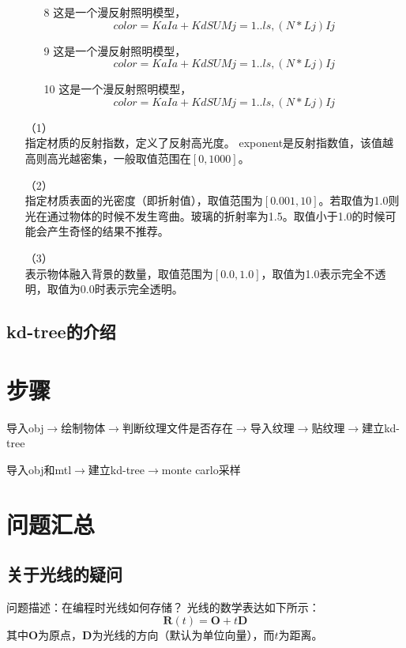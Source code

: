\documentclass[10pt]{article}
\begin{document}
\begin{itemize}
\begin{itemize}
\item[8]{这是一个漫反射照明模型，}
$$color=KaIa+ Kd { SUM j=1..ls, (N * Lj)Ij }$$

\item[9]{这是一个漫反射照明模型，}
$$color=KaIa+ Kd { SUM j=1..ls, (N * Lj)Ij }$$

\item[10]{ 这是一个漫反射照明模型，}
$$color=KaIa+ Kd { SUM j=1..ls, (N * Lj)Ij }$$
\end{itemize}


\item[（1）]{}\\
指定材质的反射指数，定义了反射高光度。 exponent是反射指数值，该值越高则高光越密集，一般取值范围在$[0,1000]$。 

\item[（2）]{} \\
指定材质表面的光密度（即折射值），取值范围为$[0.001,10]$。若取值为1.0则光在通过物体的时候不发生弯曲。玻璃的折射率为1.5。取值小于1.0的时候可能会产生奇怪的结果不推荐。

\item[（3）]{}\\
表示物体融入背景的数量，取值范围为$[0.0,1.0]$，取值为1.0表示完全不透明，取值为0.0时表示完全透明。

\end{itemize}


\subsection{kd-tree的介绍}


\section{步骤}
导入obj$\to$绘制物体$\to$判断纹理文件是否存在$\to$导入纹理$\to$贴纹理$\to$建立kd-tree

导入obj和mtl$\to$建立kd-tree$\to$monte carlo采样

\section{问题汇总}
\subsection{关于光线的疑问}
问题描述：在编程时光线如何存储？
光线的数学表达如下所示：
$$\bm{R}(t)=\bm{O}+t\bm{D}$$
其中$\bm{O}$为原点，$\bm{D}$为光线的方向（默认为单位向量），而$t$为距离。
\end{document}
